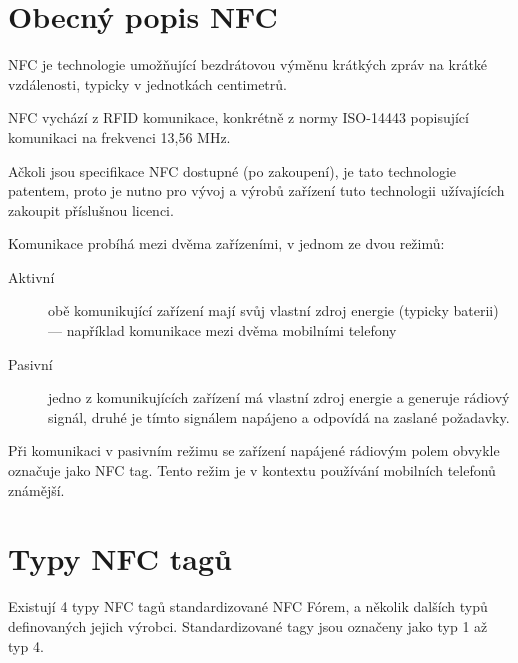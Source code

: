 


\section{Obecný popis NFC}

    NFC je technologie umožňující bezdrátovou výměnu krátkých zpráv na 
    krátké vzdálenosti, typicky v jednotkách centimetrů.

    NFC vychází z RFID komunikace, konkrétně z normy ISO-14443 popisující
    komunikaci na frekvenci 13,56 MHz.

    Ačkoli jsou specifikace NFC dostupné (po zakoupení), je tato technologie 
    patentem, proto je nutno pro vývoj a výrobů zařízení tuto technologii 
    užívajících zakoupit příslušnou licenci.

    Komunikace probíhá mezi dvěma zařízeními, v jednom ze dvou režimů:

    \begin{description}
        \item [Aktivní] obě komunikující zařízení mají svůj vlastní zdroj
            energie (typicky baterii) --- například komunikace mezi dvěma mobilními telefony
        \item [Pasivní] jedno z komunikujících zařízení má vlastní zdroj energie
            a generuje rádiový signál, druhé je tímto signálem napájeno a
            odpovídá na zaslané požadavky.
    \end{description}

    Při komunikaci v pasivním režimu se zařízení napájené rádiovým polem obvykle
    označuje jako NFC tag. Tento režim je v kontextu používání mobilních 
    telefonů známější.

\section{Typy NFC tagů}

    Existují 4 typy NFC tagů standardizované NFC Fórem, a několik dalších typů
    definovaných jejich výrobci. Standardizované tagy jsou označeny jako 
    typ 1 až typ 4.

